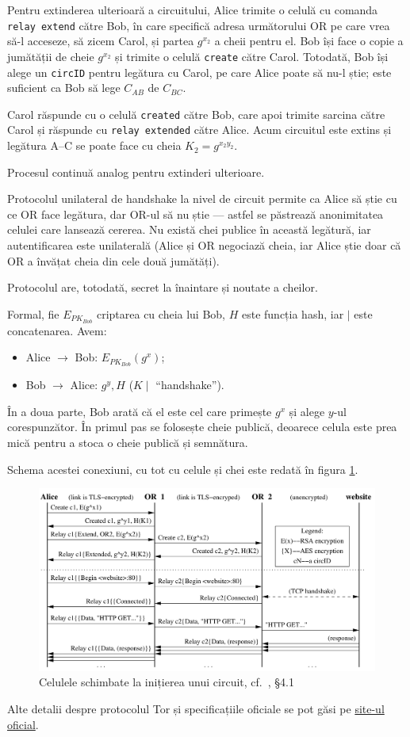 Pentru extinderea ulterioară a circuitului, Alice trimite o celulă cu
comanda \texttt{relay extend} către Bob, în care specifică adresa
următorului OR pe care vrea să-l acceseze, să zicem Carol, și partea
$ g^{x_2} $ a cheii pentru el. Bob își face o copie a jumătății de cheie
$ g^{x_2} $ și trimite o celulă \texttt{create} către Carol. Totodată,
Bob își alege un \texttt{circID} pentru legătura cu Carol, pe care Alice
poate să nu-l știe; este suficient ca Bob să lege $ C_{AB} $ de $ C_{BC} $.

Carol răspunde cu o celulă \texttt{created} către Bob, care apoi trimite
sarcina către Carol și răspunde cu \texttt{relay extended} către Alice.
Acum circuitul este extins și legătura A--C se poate face cu cheia
$ K_2 = g^{x_2y_2} $.

Procesul continuă analog pentru extinderi ulterioare.

Protocolul unilateral de handshake la nivel de circuit permite ca Alice să
știe cu ce OR face legătura, dar OR-ul să nu știe --- astfel se
păstrează anonimitatea celulei care lansează cererea. Nu există chei publice
în această legătură, iar autentificarea este unilaterală (Alice și OR
negociază cheia, iar Alice știe doar că OR a învățat cheia din cele
două jumătăți).

Protocolul are, totodată, secret la înaintare și noutate a cheilor.

Formal, fie $ E_{PK_{Bob}} $ criptarea cu cheia lui Bob, $ H $ este funcția
hash, iar $ \mid $ este concatenarea. Avem:
\begin{itemize}
  \item Alice $ \longrightarrow $ Bob: $E_{PK_{Bob}}(g^x) $;
  \item Bob $ \longrightarrow $ Alice: $ g^y, H$ ($ K \mid$ ``handshake'').
\end{itemize}

În a doua parte, Bob arată că el este cel care primește $ g^x $ și alege
$ y $-ul corespunzător. În primul pas se folosește cheie publică, deoarece
celula este prea mică pentru a stoca o cheie publică și semnătura.

Schema acestei conexiuni, cu tot cu celule și chei este redată în figura \ref{fig:cells}.

\begin{figure}[!htbp]
  \centering
  \includegraphics{fig/cells.png}
  \caption{Celulele schimbate la inițierea unui circuit, cf.\ \cite{whitepaper}, \S4.1}
  \label{fig:cells}
\end{figure}



\vspace{1cm}

Alte detalii despre protocolul Tor și specificațiile oficiale se pot
găsi pe \href{https://gitweb.torproject.org/torspec.git/tree/}{site-ul oficial}.
